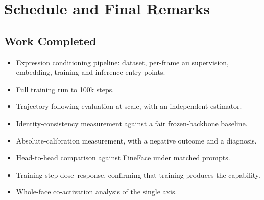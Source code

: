 \chapter{Schedule and Final Remarks}\label{cap:schedule}
\glsresetall

%
%

\section{Work Completed}\label{sec:sched-completed}

\begin{itemize}
    \item Expression conditioning pipeline: dataset, per-frame \gls{au} supervision, embedding, training and inference entry points.
    \item Full training run to 100k steps.
    \item Trajectory-following evaluation at scale, with an independent estimator.
    \item Identity-consistency measurement against a fair frozen-backbone baseline.
    \item Absolute-calibration measurement, with a negative outcome and a diagnosis.
    \item Head-to-head comparison against FineFace under matched prompts.
    \item Training-step dose--response, confirming that training produces the capability.
    \item Whole-face co-activation analysis of the single axis.
\end{itemize}


